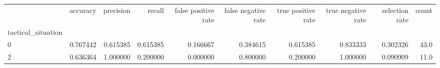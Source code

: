 \begin{tabular}{lrrrrrrrrr}
\toprule
{} &  accuracy &  precision &    recall &  false positive rate &  false negative rate &  true positive rate &  true negative rate &  selection rate &  count \\
tactical\_situation &           &            &           &                      &                      &                     &                     &                 &        \\
\midrule
0                  &  0.767442 &   0.615385 &  0.615385 &             0.166667 &             0.384615 &            0.615385 &            0.833333 &        0.302326 &   43.0 \\
2                  &  0.636364 &   1.000000 &  0.200000 &             0.000000 &             0.800000 &            0.200000 &            1.000000 &        0.090909 &   11.0 \\
\bottomrule
\end{tabular}
